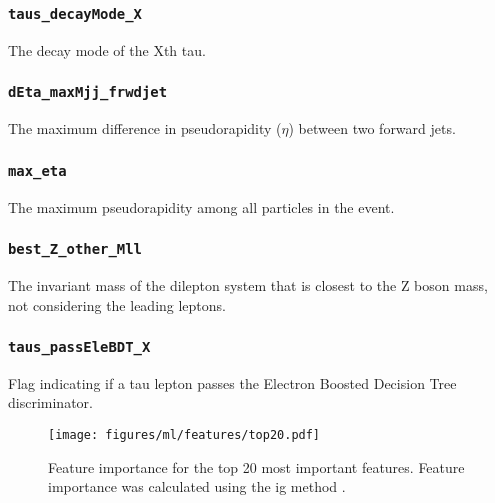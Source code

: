\subsubsection{\texttt{taus\_decayMode\_X}} The decay mode of the Xth tau.

\subsubsection{\texttt{dEta\_maxMjj\_frwdjet}} The maximum difference in pseudorapidity ($\eta$) between two forward jets.

\subsubsection{\texttt{max\_eta}} The maximum pseudorapidity among all particles in the event.

\subsubsection{\texttt{best\_Z\_other\_Mll}} The invariant mass of the dilepton system that is closest to the Z boson mass,
not considering the leading leptons.

\subsubsection{\texttt{taus\_passEleBDT\_X}} Flag indicating if a tau lepton passes the Electron Boosted Decision Tree
discriminator.

\begin{figure}[hbtp]
    \centering
    \texttt{[image: figures/ml/features/top20.pdf]}
    \caption{Feature importance for the top 20 most important features. Feature importance was calculated using the
        \gls{ig} method \cite{ig}.}
    \label{fig:feature_importance}
\end{figure}

\clearpage